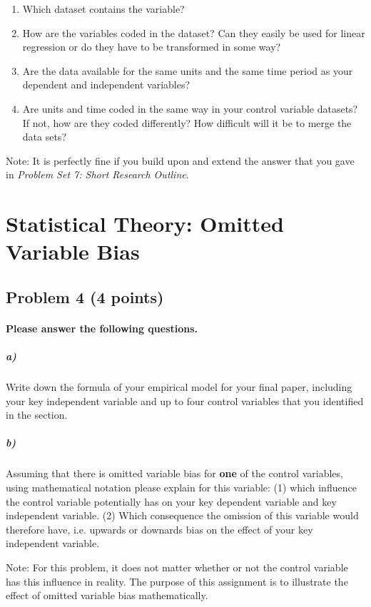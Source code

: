 \documentclass[12pt]{article}
\begin{document}
\begin{enumerate}
	\item Which dataset contains the variable?
	\item How are the variables coded in the dataset? Can they easily be used for linear regression or do they have to be transformed in some way?
	\item Are the data available for the same units and the same time period as your dependent and independent variables?
	\item Are units and time coded in the same way in your control variable datasets? If not, how are they coded differently? How difficult will it be to merge the data sets?
\end{enumerate}

Note: It is perfectly fine if you build upon and extend the answer that you gave in \textit{Problem Set 7: Short Research Outline}.



\section*{Statistical Theory: Omitted Variable Bias}

\subsection*{Problem 4 (4 points)}

\paragraph{Please answer the following questions.}

\subparagraph{a)} Write down the formula of your empirical model for your final paper, including your key independent variable and up to four control variables that you identified in the section.

\subparagraph{b)} Assuming that there is omitted variable bias for \textbf{one} of the control variables, using mathematical notation please explain for this variable: (1) which influence the control variable potentially has on your key dependent variable and key independent variable. (2) Which consequence the omission of this variable would therefore have, i.e. upwards or downards bias on the effect of your key independent variable.

Note: For this problem, it does not matter whether or not the control variable has this influence in reality. The purpose of this assignment is to illustrate the effect of omitted variable bias mathematically.
\end{document}
